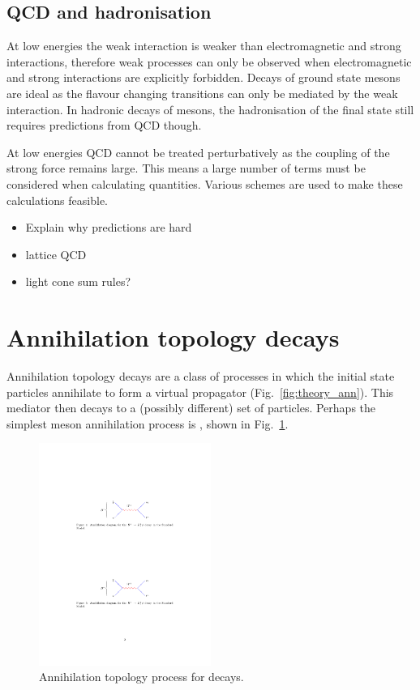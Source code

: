 \subsection{QCD and hadronisation}

At low energies the weak interaction is weaker than electromagnetic and strong interactions, therefore weak processes can only be observed when electromagnetic and strong interactions are explicitly forbidden. Decays of ground state \Bp mesons are ideal as the flavour changing transitions can only be mediated by the weak interaction. In hadronic decays of \Bp mesons, the hadronisation of the final state still requires predictions from QCD though.

At low energies QCD cannot be treated perturbatively as the coupling of the strong force remains large. This means a large number of terms must be considered when calculating quantities. 
Various schemes are used to make these calculations feasible. 
 
{\color{Red}
\begin{itemize}
\item Explain why predictions are hard
\item lattice QCD
\item light cone sum rules? 
\end{itemize}}

\section{Annihilation topology decays}

Annihilation topology decays are a class of processes in which the initial state particles annihilate to form a virtual propagator (Fig.~\ref{fig:theory_ann}). This mediator then decays to a (possibly different) set of particles.
Perhaps the simplest \Bp meson annihilation process is \decay{\Bp}{\ellp\neul}, shown in Fig.~\ref{fig:Theory_B2ellnu}. 
\begin{figure}[!h]
    \centering
        \centering
        \includegraphics[width=0.5\textwidth]{figs/Theory/B2ellnu.pdf}
    \caption{Annihilation topology process for \decay{\Bp}{\ellp\neul} decays.}
    \label{fig:Theory_B2ellnu}   
\end{figure}

